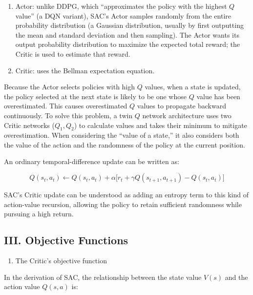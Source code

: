 \begin{enumerate}
\def\labelenumi{\arabic{enumi}.}
\item
  Actor: unlike DDPG, which ``approximates the policy with the highest \(Q\) value'' (a DQN variant), SAC's Actor samples randomly from the entire probability distribution (a Gaussian distribution, usually by first outputting the mean and standard deviation and then sampling). The Actor wants its output probability distribution to maximize the expected total reward; the Critic is used to estimate that reward.
\item
  Critic: uses the Bellman expectation equation.
\end{enumerate}

Because the Actor selects policies with high \(Q\) values, when a state is updated, the policy selected at the next state is likely to be one whose \(Q\) value has been overestimated. This causes overestimated \(Q\) values to propagate backward continuously. To solve this problem, a twin \(Q\) network architecture uses two Critic networks (\(Q_1,Q_2\)) to calculate values and takes their minimum to mitigate overestimation. When considering the ``value of a state,'' it also considers both the value of the action and the randomness of the policy at the current position.

An ordinary temporal-difference update can be written as:

\[
Q(s_t,a_t)
\leftarrow
Q(s_t,a_t)
+
\alpha
\bigl[
r_t+\gamma Q(s_{t+1},a_{t+1})-Q(s_t,a_t)
\bigr]
\]

SAC's Critic update can be understood as adding an entropy term to this kind of action-value recursion, allowing the policy to retain sufficient randomness while pursuing a high return.

\hypertarget{iii.-objective-functions}{%
\subsection{III. Objective Functions}\label{iii.-objective-functions}}

\begin{enumerate}
\def\labelenumi{\arabic{enumi}.}
\tightlist
\item
  The Critic's objective function
\end{enumerate}

In the derivation of SAC, the relationship between the state value \(V(s)\) and the action value \(Q(s,a)\) is:


